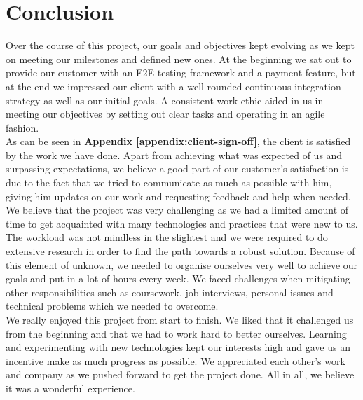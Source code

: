 \chapter{Conclusion}
\label{chap:conclusion}

Over the course of this project, our goals and objectives kept evolving as we kept on meeting our milestones and defined new ones. At the beginning we sat out to provide our customer with an E2E testing framework and a payment feature, but at the end we impressed our client with a well-rounded continuous integration strategy as well as our initial goals. A consistent work ethic aided in us in meeting our objectives by setting out clear tasks and operating in an agile fashion.\\

As can be seen in \textbf{Appendix \ref{appendix:client-sign-off}}, the client is satisfied by the work we have done. Apart from achieving what was expected of us and surpassing expectations, we believe a good part of our customer's satisfaction is due to the fact that we tried to communicate as much as possible with him, giving him updates on our work and requesting feedback and help when needed.\\

We believe that the project was very challenging as we had a limited amount of time to get acquainted with many technologies and practices that were new to us. The workload was not mindless in the slightest and we were required to do extensive research in order to find the path towards a robust solution. Because of this element of unknown, we needed to organise ourselves very well to achieve our goals and put in a lot of hours every week. We faced challenges when mitigating other responsibilities such as coursework, job interviews, personal issues and technical problems which we needed to overcome.\\

We really enjoyed this project from start to finish. We liked that it challenged us from the beginning and that we had to work hard to better ourselves. Learning and experimenting with new technologies kept our interests high and gave us an incentive make as much progress as possible. We appreciated each other's work and company as we pushed forward to get the project done. All in all, we believe it was a wonderful experience.
